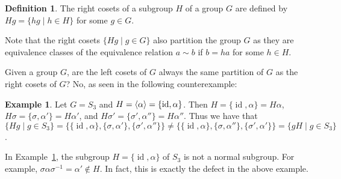 \documentclass[12pt,letterpaper,DIV=11,final]{scrartcl}
\theoremstyle{plain}
\theoremstyle{definition}
\newtheorem{definition}{Definition}[section]
\newtheorem{example}{Example}[section]
\theoremstyle{remark}
\DeclareMathOperator{\id}{id}
\begin{document}
\begin{definition}
  The right cosets of a subgroup $H$ of a group $G$ are defined by $Hg = \{ hg \mid h \in H \}$ for some $g \in G$.
\end{definition}

Note that the right cosets $\{ Hg \mid g \in G \}$ also partition the group $G$ as they are equivalence classes of the equivalence relation $a \sim b$ if $b = ha$ for some $h \in H$.

Given a group $G$, are the left cosets of $G$ always the same partition of $G$ as the right cosets of $G$?
No, as seen in the following counterexample:
\begin{example}\label{ex:left_right_cosets}
  Let $G = S_3$ and $H = \braket{\alpha} = \{ \id, \alpha \}$.
  Then $H = \{ \id, \alpha \} = H \alpha$, $H \sigma = \{ \sigma, \alpha' \} = H \alpha'$, and $H \sigma' = \{ \sigma', \alpha'' \} = H \alpha''$.
  Thus we have that $\{ Hg \mid g \in S_3 \} = \{ \{ \id, \alpha \}, \{ \sigma, \alpha' \}, \{ \sigma', \alpha'' \} \} \neq \{ \{ \id, \alpha \}, \{ \sigma, \alpha'' \}, \{ \sigma', \alpha' \} \} = \{ gH \mid g \in S_3 \}$.
\end{example}
In Example~\ref{ex:left_right_cosets}, the subgroup $H = \{ \id, \alpha \}$ of $S_3$ is not a normal subgroup.
For example, $\sigma \alpha \sigma^{-1} = \alpha' \not\in H$.
In fact, this is exactly the defect in the above example.
\end{document}
